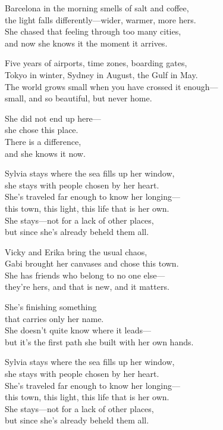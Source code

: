 \begin{lyrics}

Barcelona in the morning smells of salt and coffee,\\
the light falls differently—wider, warmer, more hers.\\
She chased that feeling through too many cities,\\
and now she knows it the moment it arrives.

Five years of airports, time zones, boarding gates,\\
Tokyo in winter, Sydney in August, the Gulf in May.\\
The world grows small when you have crossed it enough—\\
small, and so beautiful, but never home.

She did not end up here—\\
she chose this place.\\
There is a difference,\\
and she knows it now.

Sylvia stays where the sea fills up her window,\\
she stays with people chosen by her heart.\\
She’s traveled far enough to know her longing—\\
this town, this light, this life that is her own.\\
She stays—not for a lack of other places,\\
but since she’s already beheld them all.

Vicky and Erika bring the usual chaos,\\
Gabi brought her canvases and chose this town.\\
She has friends who belong to no one else—\\
they’re hers, and that is new, and it matters.

She’s finishing something\\
that carries only her name.\\
She doesn’t quite know where it leads—\\
but it’s the first path she built with her own hands.

Sylvia stays where the sea fills up her window,\\
she stays with people chosen by her heart.\\
She’s traveled far enough to know her longing—\\
this town, this light, this life that is her own.\\
She stays—not for a lack of other places,\\
but since she’s already beheld them all.


\end{lyrics}
